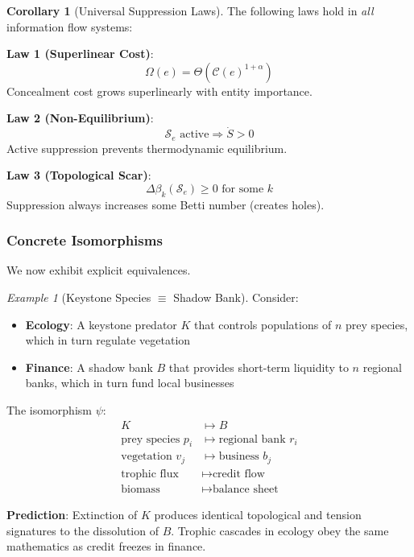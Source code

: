\documentclass[12pt,a4paper]{article}
\theoremstyle{definition}
\newtheorem{corollary}[theorem]{Corollary}
\theoremstyle{remark}
\newtheorem{example}{Example}[section]
\begin{document}
\begin{corollary}[Universal Suppression Laws]
\label{cor:universal-laws}
The following laws hold in \emph{all} information flow systems:

\textbf{Law 1 (Superlinear Cost)}:
\begin{equation}
    \Omega(e) = \Theta(\mathcal{C}(e)^{1+\alpha})
\end{equation}
Concealment cost grows superlinearly with entity importance.

\textbf{Law 2 (Non-Equilibrium)}:
\begin{equation}
    \mathcal{S}_e \text{ active} \Rightarrow \dot{S} > 0
\end{equation}
Active suppression prevents thermodynamic equilibrium.

\textbf{Law 3 (Topological Scar)}:
\begin{equation}
    \Delta\beta_k(\mathcal{S}_e) \geq 0 \text{ for some } k
\end{equation}
Suppression always increases some Betti number (creates holes).
\end{corollary}

\subsubsection{Concrete Isomorphisms}

We now exhibit explicit equivalences.

\begin{example}[Keystone Species $\equiv$ Shadow Bank]
Consider:
\begin{itemize}
    \item \textbf{Ecology}: A keystone predator $K$ that controls populations of $n$ prey species, which in turn regulate vegetation
    \item \textbf{Finance}: A shadow bank $B$ that provides short-term liquidity to $n$ regional banks, which in turn fund local businesses
\end{itemize}

The isomorphism $\psi$:
\begin{align}
    K &\mapsto B \\
    \text{prey species } p_i &\mapsto \text{regional bank } r_i \\
    \text{vegetation } v_j &\mapsto \text{business } b_j \\
    \text{trophic flux} &\mapsto \text{credit flow} \\
    \text{biomass} &\mapsto \text{balance sheet}
\end{align}

\textbf{Prediction}: Extinction of $K$ produces identical topological and tension signatures to the dissolution of $B$. Trophic cascades in ecology obey the same mathematics as credit freezes in finance.
\end{example}
\end{document}

